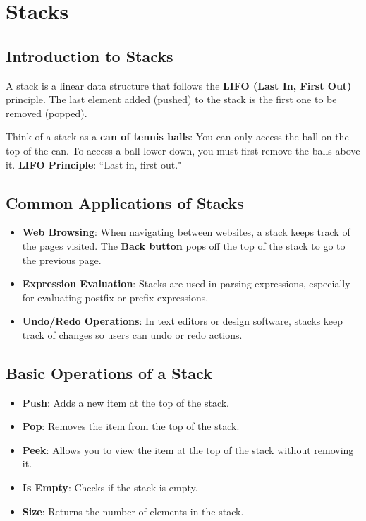 \section{Stacks}
\subsection{Introduction to Stacks}

A stack is a linear data structure that follows the \textbf{LIFO (Last In, First Out)} principle.
The last element added (pushed) to the stack is the first one to be removed (popped).

Think of a stack as a \textbf{can of tennis balls}: You can only access the ball on the top of the can.
To access a ball lower down, you must first remove the balls above it.
\textbf{LIFO Principle}: ``Last in, first out."

\subsection{Common Applications of Stacks}
\begin{itemize}
    \item \textbf{Web Browsing}: When navigating between websites, a stack keeps track of the pages visited. The \textbf{Back button} pops off the top of the stack to go to the previous page.
    \item \textbf{Expression Evaluation}: Stacks are used in parsing expressions, especially for evaluating postfix or prefix expressions.
    \item \textbf{Undo/Redo Operations}: In text editors or design software, stacks keep track of changes so users can undo or redo actions.
\end{itemize}

\subsection{Basic Operations of a Stack}

\begin{itemize}
    \item \textbf{Push}: Adds a new item at the top of the stack.
    \item \textbf{Pop}: Removes the item from the top of the stack.
    \item \textbf{Peek}: Allows you to view the item at the top of the stack without removing it.
    \item \textbf{Is Empty}: Checks if the stack is empty.
    \item \textbf{Size}: Returns the number of elements in the stack.
\end{itemize}

